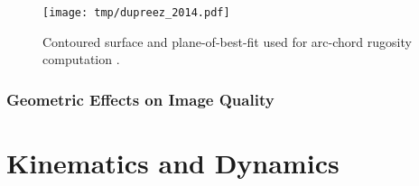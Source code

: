 \begin{figure} %
\texttt{[image: tmp/dupreez\_2014.pdf]} 
\caption{Contoured surface and plane-of-best-fit used for arc-chord rugosity computation \cite{DuPreez2014}.}
\label{fig:arcchord}
\end{figure}


\subsubsection{Geometric Effects on Image Quality}


\section{Kinematics and Dynamics}








